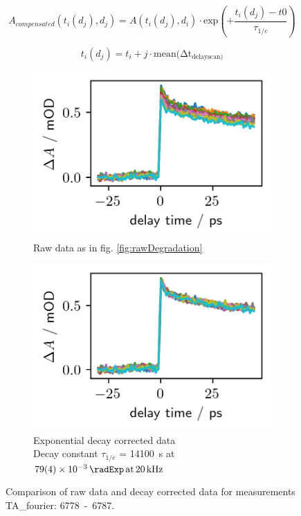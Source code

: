 \documentclass[twoside,openright]{scrreprt}
\def\pumpExp#1{\ensuremath{\SI{#1}{\radExp}\,\mathrm{at}\, \SI{20}{\kilo\hertz}}}
\begin{document}
\begin{equation}\label{eq:degradationCompensation}
A_{compensated}(t_i(d_j), d_j) = A(t_i(d_j), d_i)\cdot \mathrm{exp}\left(+\frac{t_i(d_j)-t0}{\tau_{1/e}}\right)
\end{equation}

\begin{equation*}
t_i(d_j) = t_i + j\cdot \mathrm{mean(\Delta t_{delay scan)}}
\end{equation*}

\begin{figure}[hbtp]
\centering
\begin{subfigure}[t]{0.4\linewidth}
\centering
\includegraphics[scale=1]{images/DegradationRAWPump653Probe493-Graph.png}
\caption{Raw data as in fig. \ref{fig:rawDegradation}}
\end{subfigure}
\hfill
\begin{subfigure}[t]{0.4\linewidth}
\centering
\includegraphics[scale=1]{images/DegradationCorrectedPump653Probe493-Graph.png}
\caption{Exponential decay corrected data\\
Decay constant $\tau_{1/e}$ = \SI{14100}{\second} at \pumpExp{79(4)e-3}}
\end{subfigure}
\caption{Comparison of raw data and decay corrected data for measurements TA\_fourier: \mbox{6778 - 6787}.\label{fig:degradationCorrectionComparison}}
\end{figure}
\end{document}
